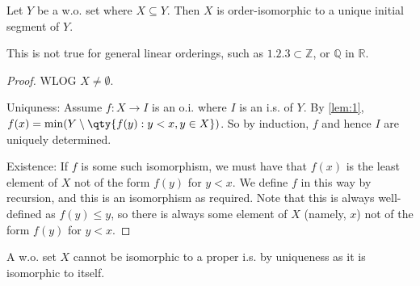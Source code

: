 \begin{proposition}
    Let $Y$ be a w.o. set where $X \subseteq Y$.
    Then $X$ is order-isomorphic to a unique initial segment of $Y$.
\end{proposition}
This is not true for general linear orderings, such as $\qty{1, 2, 3} \subset \mathbb Z$, or $\mathbb Q$ in $\mathbb R$.
\begin{proof}
    WLOG $X \neq \emptyset$.

    Uniquness: Assume $f : X \to I$ is an o.i. where $I$ is an i.s. of $Y$.
    By \cref{lem:1}, $f(x) = \min(Y \setminus \qty{f(y) : y < x, y \in X})$.
    So by induction, $f$ and hence $I$ are uniquely determined.

    Existence:
    If $f$ is some such isomorphism, we must have that $f(x)$ is the least element of $X$ not of the form $f(y)$ for $y < x$.
    We define $f$ in this way by recursion, and this is an isomorphism as required.
    Note that this is always well-defined as $f(y) \leq y$, so there is always some element of $X$ (namely, $x$) not of the form $f(y)$ for $y < x$.
\end{proof}

\begin{remark}
    A w.o. set $X$ cannot be isomorphic to a proper i.s. by uniqueness as it is isomorphic to itself.
\end{remark}

